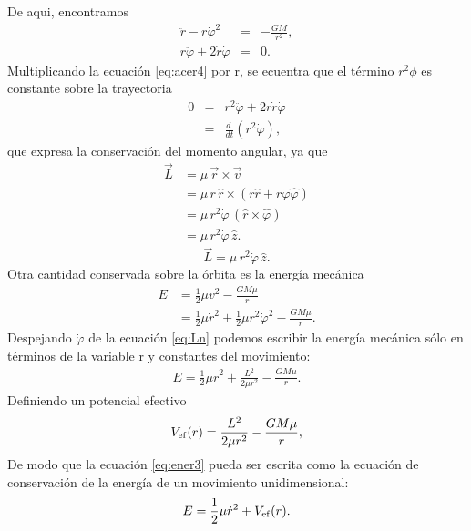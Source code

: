 De aqui, encontramos 
\begin{eqnarray}
    \ddot{r}-r\dot{\varphi}^2&=&-\frac{GM}{r^2},\label{eq:acer3}\\
    r\ddot{\varphi}+2\dot{r}\dot{\varphi}&=&0.\label{eq:acer4}
\end{eqnarray}
Multiplicando la ecuación \ref{eq:acer4} por r, se ecuentra que el término $r^2\phi$ es constante sobre la trayectoria
\begin{eqnarray*}
    0&=&r^2\ddot{\varphi}+2r\dot{r}\dot{\varphi}\\
    &=&\frac{d\ }{dt}\left(r^2\dot{\varphi}\right),
\end{eqnarray*}
que expresa la conservación del momento angular, ya que
\begin{align*}
    \vec{L} & = \mu\,\vec{r}\times\vec{v}\\
    & = \mu\,r\,\hat{r}\times\left(\dot{r}\hat{r}+r\dot{\varphi}\hat{\varphi}
    \right)\\
    & = \mu\,r^2\dot{\varphi}\,(\hat{r}\times\hat{\varphi})\\
    & = \mu\,r^2\dot{\varphi}\,\hat{z}.
    \end{align*}
\begin{equation}
    \vec{L} = \mu\,r^2\dot{\varphi}\,\hat{z}. \label{eq:Ln}
\end{equation}
Otra cantidad conservada sobre la órbita es la energía mecánica
\begin{align}
    E&=\frac{1}{2}\mu v^2-\frac{GM\mu}{r} \label{eq:ener1}\\
    &=\frac{1}{2}\mu\dot{r}^2+\frac{1}{2}\mu r^2\dot{\varphi}^2-\frac{GM\mu}{r}.\label{eq:ener2}
\end{align}
Despejando $\dot{\varphi}$ de la ecuación \ref{eq:Ln} podemos escribir la energía mecánica sólo en términos de la variable r y constantes del movimiento:
\begin{eqnarray}
    E=\frac{1}{2}\mu\dot{r}^2+\frac{L^2}{2\mu r^2}-\frac{GM\mu}{r} .\label{eq:ener3}
\end{eqnarray}
Definiendo un potencial efectivo
\begin{equation}
    V_{\rm ef}(r)=\frac{L^2}{2\mu r^2}-\frac{GM\mu}{r},
\end{equation}
De modo que la ecuación \ref{eq:ener3} pueda ser escrita como la ecuación de conservación de la energía de un movimiento unidimensional:
\begin{equation}
    E=\frac{1}{2}\mu\dot{r}^2+V_{\rm ef}(r) . \label{eq:EVef}
\end{equation}
